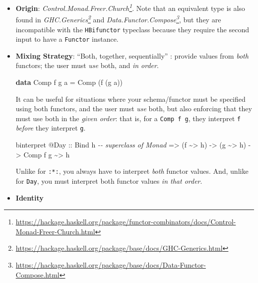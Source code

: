 \documentclass[]{article}
\newenvironment{Shaded}{}{}
\newcommand{\CommentTok}[1]{\textcolor[rgb]{0.38,0.63,0.69}{\textit{#1}}}
\newcommand{\DataTypeTok}[1]{\textcolor[rgb]{0.56,0.13,0.00}{#1}}
\newcommand{\KeywordTok}[1]{\textcolor[rgb]{0.00,0.44,0.13}{\textbf{#1}}}
\newcommand{\NormalTok}[1]{#1}
\newcommand{\OperatorTok}[1]{\textcolor[rgb]{0.40,0.40,0.40}{#1}}
\newcommand{\OtherTok}[1]{\textcolor[rgb]{0.00,0.44,0.13}{#1}}
\renewcommand{\href}[2]{#2\footnote{\url{#1}}}
\begin{document}
\begin{itemize}
\item
  \textbf{Origin}:
  \emph{\href{https://hackage.haskell.org/package/functor-combinators/docs/Control-Monad-Freer-Church.html}{Control.Monad.Freer.Church}}.
  Note that an equivalent type is also found in
  \emph{\href{https://hackage.haskell.org/package/base/docs/GHC-Generics.html}{GHC.Generics}}
  and
  \emph{\href{https://hackage.haskell.org/package/base/docs/Data-Functor-Compose.html}{Data.Functor.Compose}},
  but they are incompatible with the \texttt{HBifunctor} typeclass because they
  require the second input to have a \texttt{Functor} instance.
\item
  \textbf{Mixing Strategy}: ``Both, together, sequentially'' : provide values
  from \emph{both} functors; the user must \emph{use} both, and \emph{in order}.

\begin{Shaded}
\begin{Highlighting}[]
\KeywordTok{data} \DataTypeTok{Comp}\NormalTok{ f g a }\OtherTok{=} \DataTypeTok{Comp}\NormalTok{ (f (g a))}
\end{Highlighting}
\end{Shaded}

  It can be useful for situations where your schema/functor must be specified
  using both functors, and the user must \emph{use} both, but also enforcing
  that they must use both in the \emph{given order}: that is, for a
  \texttt{Comp\ f\ g}, they interpret \texttt{f} \emph{before} they interpret
  \texttt{g}.

\begin{Shaded}
\begin{Highlighting}[]
\NormalTok{binterpret }\OperatorTok{@}\DataTypeTok{Day}
\OtherTok{    ::} \DataTypeTok{Bind}\NormalTok{ h          }\CommentTok{{-}{-} superclass of Monad}
    \OtherTok{=>}\NormalTok{ (f }\OperatorTok{\textasciitilde{}>}\NormalTok{ h)}
    \OtherTok{{-}>}\NormalTok{ (g }\OperatorTok{\textasciitilde{}>}\NormalTok{ h)}
    \OtherTok{{-}>} \DataTypeTok{Comp}\NormalTok{ f g }\OperatorTok{\textasciitilde{}>}\NormalTok{ h}
\end{Highlighting}
\end{Shaded}

  Unlike for \texttt{:*:}, you always have to interpret \emph{both} functor
  values. And, unlike for \texttt{Day}, you must interpret both functor values
  \emph{in that order}.
\item
  \textbf{Identity}


\end{itemize}
\end{document}
